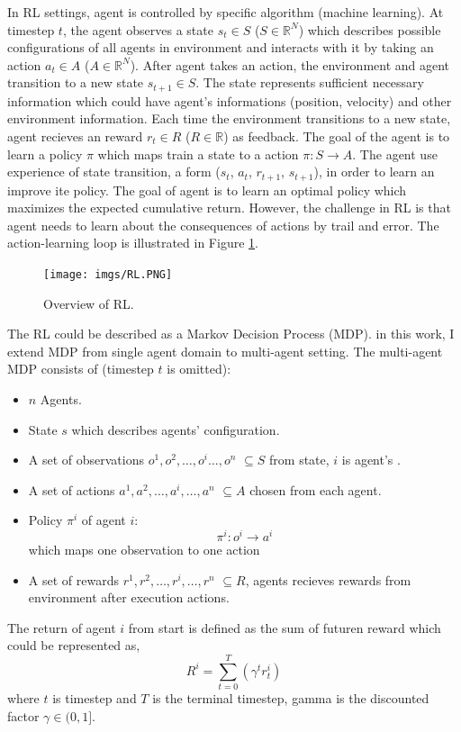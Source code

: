 \documentclass[11pt,twocolumn]{jarticle} %
\begin{document}
In RL settings, agent is controlled by specific algorithm (machine learning). At timestep $t$, the agent observes a state $s_t \in S$ ($S \in \mathbb{R}^N$) which describes possible configurations of all agents in environment and interacts with it by taking an action $a_t \in A$ ($A \in \mathbb{R}^N$). After agent takes an action, the environment and agent transition to a new state $s_{t+1} \in S$. The state represents sufficient necessary information which could have agent's informations (position, velocity) and other environment information. Each time the environment transitions to a new state, agent recieves an reward $r_t \in R$ ($R \in \mathbb{R}$) as feedback. The goal of the agent is to learn a policy $\pi$ which maps train a state to a action $\pi: S \rightarrow A$. The agent use experience of state transition, a form ($s_t$, $a_t$, $r_{t+1}$, $s_{t+1}$), in order to learn an improve ite policy. The goal of agent is to learn an optimal policy which maximizes the expected cumulative return. However, the challenge in RL is that agent needs to learn about the consequences of actions by trail and error. The action-learning loop is illustrated in Figure \ref{fig:rl}. \par
\begin{figure}[h]
 \begin{center}
  \texttt{[image: imgs/RL.PNG]}
  \caption{
  Overview of RL.
  }
  \label{fig:rl}
 \end{center}
\end{figure}

The RL could be described as a Markov Decision Process (MDP). in this work, I extend MDP from single agent domain to multi-agent setting. The multi-agent MDP consists of (timestep $t$ is omitted):
\begin{itemize}
  \item $n$ Agents.
  \item State $s$ which describes agents' configuration.
  \item A set of observations ${o^1, o^2,\ldots, o^i\ldots, o^n}$ $\subseteq S$ from state, $i$ is agent's .
  \item A set of actions ${a^1, a^2,\ldots, a^i,\ldots, a^n}$ $\subseteq A$ chosen from each agent.
  \item Policy $\pi^i$ of agent $i$: \[\pi^i: o^i \rightarrow a^i\] which maps one observation to one action
  \item A set of rewards ${r^1, r^2,\ldots, r^i,\ldots, r^n}$ $\subseteq R$, agents recieves rewards from environment after execution actions.
\end{itemize}
The return of agent $i$ from start is defined as the sum of futuren reward which could be represented as, 
$$ R^i = \sum_{t=0}^{T}(\gamma^t r_{t}^i) $$
where $t$ is timestep and $T$ is the terminal timestep, gamma is the discounted factor $\gamma \in (0, 1]$.
\end{document}
